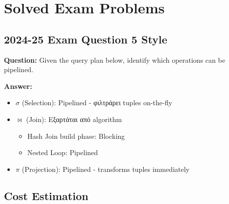 \section{Solved Exam Problems}

\subsection{2024-25 Exam Question 5 Style}

\begin{examplebox}
\textbf{Question:} Given the query plan below, identify which operations can be pipelined.

\begin{center}
\end{center}

\textbf{Answer:}
\begin{itemize}
    \item $\sigma$ (Selection): \textcolor{success}{Pipelined} - φιλτράρει tuples on-the-fly
    \item $\bowtie$ (Join): Εξαρτάται από algorithm
    \begin{itemize}
        \item Hash Join build phase: \textcolor{accent}{Blocking}
        \item Nested Loop: \textcolor{success}{Pipelined}
    \end{itemize}
    \item $\pi$ (Projection): \textcolor{success}{Pipelined} - transforms tuples immediately
\end{itemize}
\end{examplebox}

\subsection{Cost Estimation}

